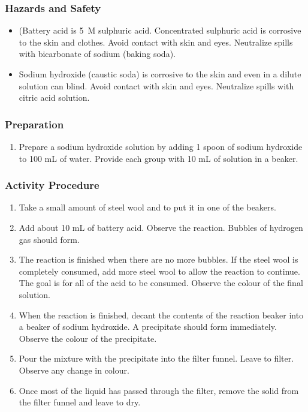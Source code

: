 \subsubsection*{Hazards and Safety}
\begin{itemize}
\item{(Battery acid is 5~M sulphuric acid. Concentrated sulphuric acid is corrosive to the skin and clothes. Avoid contact with skin and eyes. Neutralize spills with bicarbonate of sodium (baking soda).}
\item{Sodium hydroxide (caustic soda) is corrosive to the skin and even in a dilute solution can blind. Avoid contact with skin and eyes. Neutralize spills with citric acid solution.}
\end{itemize}

\subsubsection*{Preparation}
\begin{enumerate}
\item{Prepare a sodium hydroxide solution by adding 1 spoon of sodium hydroxide to 100 mL of water. Provide each group with 10 mL of solution in a beaker.}
\end{enumerate}

\subsubsection*{Activity Procedure}
\begin{enumerate}
\item{Take a small amount of steel wool and to put it in one of the beakers.}
\item{Add about 10 mL of battery acid. Observe the reaction. Bubbles of hydrogen gas should form.}
\item{The reaction is finished when there are no more bubbles. If the steel wool is completely consumed, add more steel wool to allow the reaction to continue. The goal is for all of the acid to be consumed. Observe the colour of the final solution.}
\item{When the reaction is finished, decant the contents of the reaction beaker into a beaker of sodium hydroxide. A precipitate should form immediately. Observe the colour of the precipitate.}
\item{Pour the mixture with the precipitate into the filter funnel. Leave to filter. Observe any change in colour.}
\item{Once most of the liquid has passed through the filter, remove the solid from the filter funnel and leave to dry.}
\end{enumerate}


